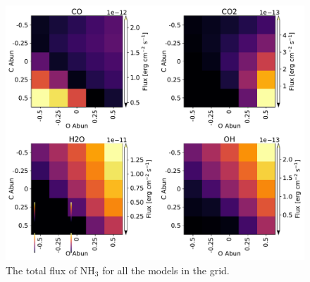 \documentclass[oneside, single, authoryear, semicolon]{lion-msc}
\newcommand{\4}{$_4$}
\newcommand{\3}{$_3$}
\newcommand{\2}{$_2$}
\begin{document}


\begin{figure}[!ht]
    \centering
    \includegraphics[width=\linewidth]{Figures/Heatmaps1.pdf}
    \caption{The total flux of NH\3 for all the models in the grid.}
    \label{fig: flux NH3}
\end{figure}
\end{document}
